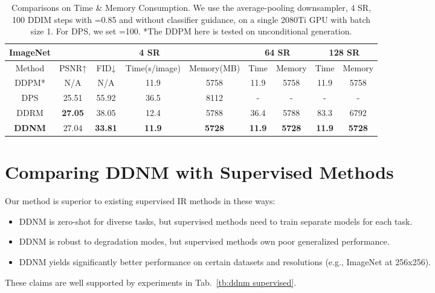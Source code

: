 \documentclass{article} \usepackage{iclr2023_conference,times}
\begin{document}
\begin{table*}[h]
\scriptsize
\centering
    \begin{tabular}{c | cccc | cc| cc}
    \hline
           \multicolumn{1}{c}{\rule{0pt}{8pt}\tiny\textbf{ImageNet}}&\multicolumn{4}{|c}{4 SR} &\multicolumn{2}{|c}{64 SR}&\multicolumn{2}{|c}{128 SR}\\
        \hline
           \rule{0pt}{8pt}Method& PSNR↑&FID↓ & Time(s/image) & Memory(MB)& Time & Memory & Time & Memory \\
        \hline
            \rule{0pt}{8pt}{DDPM*} &N/A&N/A &11.9&5758&11.9&5758&11.9&5758\\
            \rule{0pt}{8pt}{DPS} &25.51&55.92 &36.5&8112 &-&-&-&-\\
            \rule{0pt}{8pt}{DDRM} &\textbf{27.05}&38.05 &12.4&5788 &36.4&5788&83.3&6792\\
            \rule{0pt}{8pt}{\textbf{DDNM}} & 27.04&\textbf{33.81}&\textbf{11.9}& \textbf{5728}&\textbf{11.9}& \textbf{5728}&\textbf{11.9}& \textbf{5728}\\
        \hline
    \end{tabular}
    \caption{Comparisons on Time \& Memory Consumption. We use the average-pooling downsampler, 4 SR, 100 DDIM steps with =0.85 and without classifier guidance, on a single 2080Ti GPU with batch size 1. For DPS, we set =100. *The DDPM here is tested on unconditional generation.}
    \label{tb:ddnm time and memory}
\end{table*}

\section{Comparing DDNM with Supervised Methods}
\label{ap: compare supervised}
Our method is superior to existing supervised IR methods \citep{zhang2021designing,liang2021swinir} in these ways:
\begin{itemize}
\item DDNM is zero-shot for diverse tasks, but supervised methods need to train separate models for each task.
\item DDNM is robust to degradation modes, but supervised methods own poor generalized performance.
\item DDNM yields significantly better performance on certain datasets and resolutions (e.g., ImageNet at 256x256).
\end{itemize}
These claims are well supported by experiments in Tab.~\ref{tb:ddnm supervised}.
\end{document}
